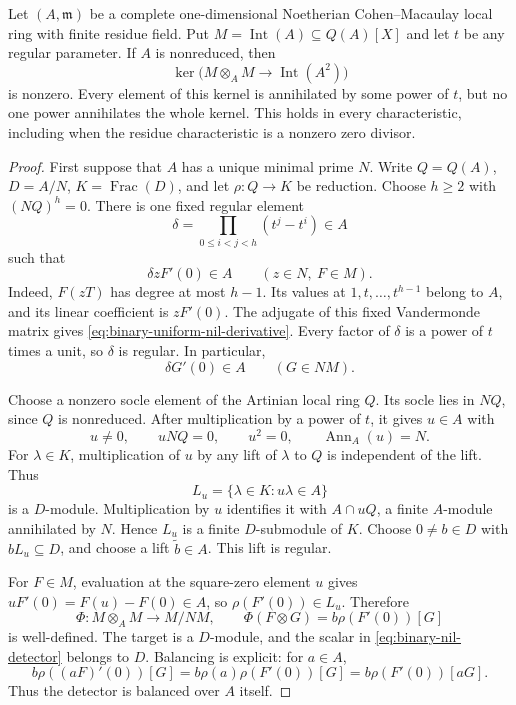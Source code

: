 \begin{theorem}
\label{lem:nilpotent-without-section}
Let $(A,\mathfrak m)$ be a complete one-dimensional Noetherian
Cohen--Macaulay local ring with finite residue field.  Put
$M=\operatorname{Int}(A)\subseteq Q(A)[X]$ and let $t$ be any
regular parameter.  If $A$ is nonreduced, then
\[
 \ker\bigl(M\otimes_A M\longrightarrow\operatorname{Int}(A^2)\bigr)
\]
is nonzero.  Every element of this kernel is annihilated by some
power of $t$, but no one power annihilates the whole kernel.
This holds in every characteristic, including when the residue
characteristic is a nonzero zero divisor.
\end{theorem}
\begin{proof}
First suppose that $A$ has a unique minimal prime $N$.
Write $Q=Q(A)$, $D=A/N$, $K=\operatorname{Frac}(D)$, and let
$\rho:Q\to K$ be reduction.  Choose $h\ge2$ with $(NQ)^h=0$.
There is one fixed regular element
\[
 \delta=\prod_{0\le i<j<h}(t^j-t^i)\in A
\]
such that
\begin{equation}\label{eq:binary-uniform-nil-derivative}
 \delta zF'(0)\in A\qquad(z\in N,\ F\in M).                 
\end{equation}
Indeed, $F(zT)$ has degree at most $h-1$.  Its values at
$1,t,\ldots,t^{h-1}$ belong to $A$, and its linear coefficient
is $zF'(0)$.  The adjugate of this fixed Vandermonde matrix gives
\eqref{eq:binary-uniform-nil-derivative}.  Every factor of $\delta$ is a power of $t$ times a unit,
so $\delta$ is regular.  In particular,
\begin{equation}\label{eq:binary-nil-submodule-derivative}
 \delta G'(0)\in A\qquad(G\in NM).                         
\end{equation}

Choose a nonzero socle element of the Artinian local ring $Q$.
Its socle lies in $NQ$, since $Q$ is nonreduced.
After multiplication by a power of $t$, it gives $u\in A$ with
\[
 u\ne0,\qquad uNQ=0,\qquad u^2=0,\qquad
 \operatorname{Ann}_A(u)=N.
\]
For $\lambda\in K$, multiplication of $u$ by any lift of
$\lambda$ to $Q$ is independent of the lift.  Thus
\[
 L_u=\{\lambda\in K:u\lambda\in A\}
\]
is a $D$-module.  Multiplication by $u$ identifies it with
$A\cap uQ$, a finite $A$-module annihilated by $N$.
Hence $L_u$ is a finite $D$-submodule of $K$.
Choose $0\ne b\in D$ with $bL_u\subseteq D$, and choose a lift
$\widetilde b\in A$.  This lift is regular.

For $F\in M$, evaluation at the square-zero element $u$ gives
$uF'(0)=F(u)-F(0)\in A$, so $\rho(F'(0))\in L_u$.
Therefore
\begin{equation}\label{eq:binary-nil-detector}
 \Phi:M\otimes_A M\longrightarrow M/NM,\qquad
 \Phi(F\otimes G)=b\rho(F'(0))[G]                          
\end{equation}
is well-defined.  The target is a $D$-module, and the scalar in
\eqref{eq:binary-nil-detector} belongs to $D$.  Balancing is explicit: for $a\in A$,
\[
 b\rho((aF)'(0))[G]
 =b\rho(a)\rho(F'(0))[G]
 =b\rho(F'(0))[aG].
\]
Thus the detector is balanced over $A$ itself.


\end{proof}
